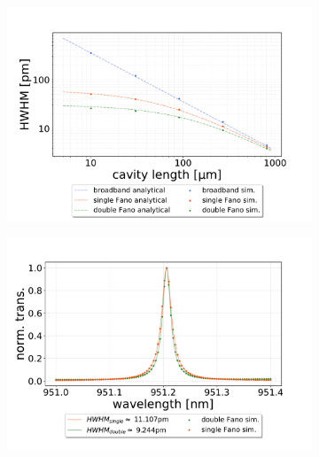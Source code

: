 \begin{figure}[h!]
    \centering
    \begin{subfigure}[c]{0.7\textwidth}
        \centering
        \includegraphics[width=\textwidth]{figures/HWHM_broadband_vs_single_vs_double_sim.pdf}
        \caption{}
        \label{fig:HWHM_double_vs_single_vs_broadband}
    \end{subfigure}
    \begin{subfigure}[c]{0.49\textwidth}
        \includegraphics[width=\textwidth]{figures/sim_single_vs_double_270um.pdf}
        \caption{}
        \label{fig:700um_double_and_single_fano_peak}
    \end{subfigure}
    \begin{subfigure}[c]{0.49\textwidth}

\end{subfigure}
\end{figure}
